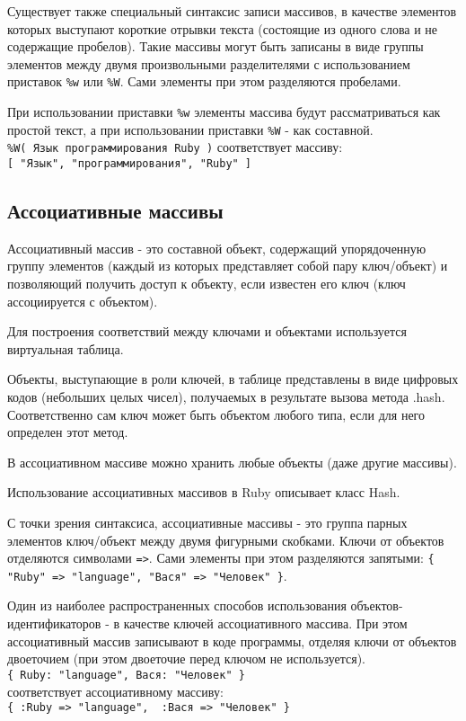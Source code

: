 Существует также специальный синтаксис записи массивов, в качестве элементов которых выступают короткие отрывки текста (состоящие из одного слова и не содержащие пробелов). Такие массивы могут быть записаны в виде группы элементов между двумя произвольными разделителями с использованием приставок \verb!%w! или \verb!%W!. Сами элементы при этом разделяются пробелами.

При использовании приставки \verb!%w! элементы массива будут рассматриваться как простой текст, а при использовании приставки \verb!%W! - как составной.
\\\verb!%W( Язык программирования Ruby )! соответствует массиву:
\\\verb![ "Язык", "программирования", "Ruby" ]!

\subsection{Ассоциативные массивы}

Ассоциативный массив - это составной объект, содержащий упорядоченную группу элементов (каждый из которых представляет собой пару ключ/объект) и позволяющий получить доступ к объекту, если известен его ключ (ключ ассоциируется с объектом). 

\begin{note}
  Для построения соответствий между ключами и объектами используется виртуальная таблица. 

  Объекты, выступающие в роли ключей, в таблице представлены в виде цифровых кодов (небольших целых чисел), получаемых в результате вызова метода .hash. Соответственно сам ключ может быть объектом любого типа, если для него определен этот метод.
\end{note}
  
В ассоциативном массиве можно хранить любые объекты (даже другие массивы).

Использование ассоциативных массивов в Ruby описывает класс Hash.

С точки зрения синтаксиса, ассоциативные массивы - это группа парных элементов ключ/объект между двумя фигурными скобками. Ключи от объектов отделяются символами \verb!=>!. Сами элементы при этом разделяются запятыми: \verb!{ "Ruby" => "language", "Вася" => "Человек" }!.

Один из наиболее распространенных способов использования объектов-идентификаторов - в качестве ключей ассоциативного массива. При этом ассоциативный массив записывают в коде программы, отделяя ключи от объектов двоеточием (при этом двоеточие перед ключом не используется).
\\\verb!{ Ruby: "language", Вася: "Человек" }!
\\ соответствует ассоциативному массиву:
\\\verb!{ :Ruby => "language",  :Вася => "Человек" }!

